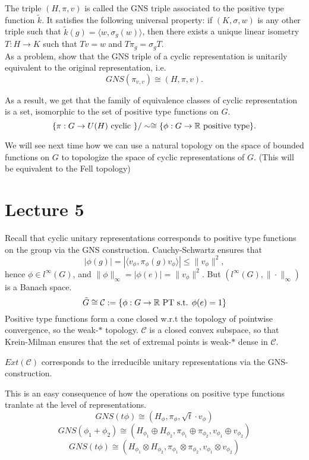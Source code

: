 The triple $(H,\pi,v)$ is called the GNS triple associated to the positive type function $\tilde k$. It satisfies the following universal property: if $(K,\sigma , w)$ is any other triple such that $\tilde k(g)=\langle w , \sigma_g (w)\rangle$, then there exists a unique linear isometry $T: H\rightarrow K $ such that $Tv= w$ and $T\pi_g = \sigma_g T$.\\

As a problem, show that the GNS triple of a cyclic representation is unitarily equivalent to the original representation, i.e. 
\[GNS(\pi_{v,v}) \cong (H,\pi,v).\]  

As a result, we get that the family of equivalence classes of cyclic representation is a set, isomorphic to the set of positive type functions on $G$.
\[\{ \pi: G\rightarrow U(H) \text{ cyclic } \} / \sim \cong \{\phi : G \rightarrow \mathbb R \text{ positive type}\}.\] 

We will see next time how we can use a natural topology on the space of bounded functions on $G$ to topologize the space of cyclic representations of $G$. (This will be equivalent to the Fell topology)

\section{Lecture 5}
Recall that cyclic unitary representations corresponds to positive type functions on the group via the GNS construction. Cauchy-Schwartz ensures that
\[|\phi(g) | = |\langle v_\phi , \pi_\phi(g)v_\phi \rangle | \leq \|v_\phi \|^2,\]
hence $\phi\in l^\infty(G)$, and $\|\phi\|_\infty = |\phi(e)| =\|v_\phi \|^2$. But $(l^\infty(G), \|\cdot\|_\infty )$ is a Banach space. 
\[\tilde G\cong \mathcal C :=\{\phi: G\rightarrow \mathbb R \text{ PT s.t. }\phi(e) = 1\}\] 
Positive type functions form a cone closed w.r.t the topology of pointwise convergence, so the weak-$*$ topology. $\mathcal C$ is a closed convex subspace, so that Krein-Milman ensures that the set of extremal points is weak-$*$ dense in $\mathcal C$.

\begin{prop}
$Ext(\mathcal C)$ corresponds to the irreducible unitary representations via the GNS-construction.
\end{prop}  
 
This is an easy consequence of how the operations on positive type functions tranlate at the level of representations.
\[GNS(t\phi)\cong (H_\phi, \pi_\phi, \sqrt{t}\cdot v_\phi)\]
\[GNS(\phi_1+\phi_2)\cong (H_{\phi_1} \oplus H_{\phi_2}, \pi_{\phi_1}\oplus \pi_{\phi_2}, v_{\phi_1}\oplus v_{\phi_2})\]
\[GNS(t\phi)\cong (H_{\phi_1} \otimes H_{\phi_2}, \pi_{\phi_1}\otimes \pi_{\phi_2}, v_{\phi_1}\otimes v_{\phi_2})\]

